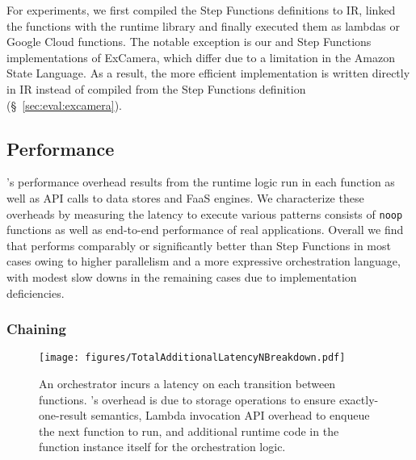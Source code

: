  For \name{} experiments, we
 first compiled the Step Functions definitions to \name{} IR, linked the
 functions with the \name{} runtime library and finally executed them as
 lambdas or Google Cloud functions. The notable exception is our \name{} and
 Step Functions implementations of ExCamera, which differ due to a limitation
 in the Amazon State Language. As a result, the more efficient \name
 {} implementation is written directly in \name{} IR instead of compiled from
 the Step Functions definition (\S~\ref{sec:eval:excamera}).

\subsection{Performance}\label{sec:eval:micro}

\name{}'s performance overhead results from the \name{} runtime logic run in
each function as well as API calls to data stores and FaaS engines. We
characterize these overheads by measuring the latency to execute various
patterns consists of \texttt{noop} functions as well as end-to-end performance
of real applications. Overall we find that \name{} performs comparably or
significantly better than Step Functions in most cases owing to higher
parallelism and a more expressive orchestration language, with modest slow
downs in the remaining cases due to implementation deficiencies.

\subsubsection{Chaining}\label{sec:eval:chain}

\begin{figure}[t]
  \centering
  \texttt{[image: figures/TotalAdditionalLatencyNBreakdown.pdf]}
  \caption{An orchestrator incurs a latency on each transition between
functions. \name{}'s overhead is due to storage operations to ensure
exactly-one-result semantics, Lambda invocation API overhead to enqueue the
next function to run, and additional \name{} runtime code in the function
instance itself for the orchestration logic.}
  \label{fig:single-transition-latency-breakdown}
\end{figure}

